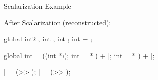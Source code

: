 \begin{frame}[fragile]{Scalarization Example}
\begin{minipage}[t]{0.49\linewidth}
\vspace{0.1ex}
After Scalarization (reconstructed):
\begin{codebox}[commandchars=\\\[\]]
global int2 \uniform[*src], int \uniform[*left], int \uniform[*right];
int \varying[tid] = ;

global int \uniform[*srcScalar] = ((int *)\uniform[src]);
int \varying[sampleLeft] = \uniform[srcScalar]\idx[(\varying[tid] * \uniform[2]) + \uniform[0]];
int \varying[sampleRight] = \uniform[srcScalar]\idx[(\varying[tid] * \uniform[2]) + \uniform[1]];

\uniform[left]\idx[\varying[tid]] = (\varying[sampleLeft] >> \uniform[1]);
\uniform[right]\idx[\varying[tid]] = (\varying[sampleRight] >> \uniform[1]);
\end{codebox}

\end{minipage}

\end{frame}


%
%
%
